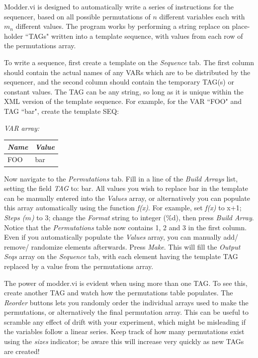 \documentclass[10pt,a4paper]{article}
\begin{document}
Modder.vi is designed to automatically write a series of instructions for the sequencer, based on all possible permutations of $n$ different variables each with $m_n$ different values.  The program works by performing a string replace on place-holder ``TAGs" written into a template sequence, with values from each row of the permutations array.  

To write a sequence, first create a template on the \emph{Sequence} tab.  The first column should contain the actual names of any VARs which are to be distributed by the sequencer, and the second column should contain the temporary TAG(s) or constant values.  The TAG can be any string, so long as it is unique within the XML version of the template sequence.  For example, for the VAR ``FOO" and TAG ``bar", create the template SEQ:

\hangindent=0.7cm
\emph{VAR array:} \\
\begin{tabularx}{0.3\textwidth}{X|X}
	\emph{Name} & \emph{Value} \\
	\hline
	FOO & bar \\
\end{tabularx}
\vspace{3mm}

Now navigate to the \emph{Permutations} tab.  Fill in a line of the \emph{Build Arrays} list, setting the field \emph{TAG} to: bar.  All values you wish to replace bar in the template can be manually entered into the \emph{Values} array, or alternatively you can populate this array automatically using the function \emph{f(x)}.  For example, set \emph{f(x)} to x+1; \emph{Steps ($m$)} to 3; change the \emph{Format} string to integer (\%d), then press \emph{Build Array}.  Notice that the \emph{Permutations} table now contains 1, 2 and 3 in the first column.  Even if you automatically populate the \emph{Values} array, you can manually add/ remove/ randomize elements afterwards. Press \emph{Make}.  This will fill the \emph{Output Seqs} array on the \emph{Sequence} tab, with each element having the template TAG replaced by a value from the permutations array.

The power of modder.vi is evident when using more than one TAG.  To see this, create another TAG and watch how the permutations table populates.  The \emph{Reorder} buttons lets you randomly order the individual arrays used to make the permutations, or alternatively the final permutation array.  This can be useful to scramble any effect of drift with your experiment, which might be misleading if the variables follow a linear series.  Keep track of how many permutations exist using the \emph{sizes} indicator; be aware this will increase very quickly as new TAGs are created!
\end{document}
